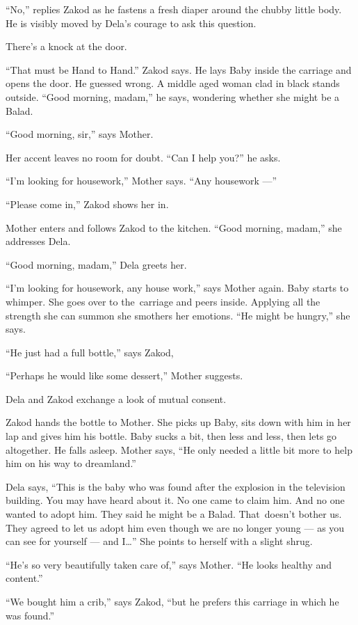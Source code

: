 \documentclass[twoside,11pt]{book}
\begin{document}
``No,'' replies Zakod as he fastens a fresh diaper around the chubby little body. He is
visibly moved by Dela's courage to ask this question.

There's a knock at the door.

``That must be Hand to Hand.'' Zakod says. He lays Baby inside the carriage  and opens the door. He
guessed wrong. A middle aged woman clad in black stands outside.
``Good morning, madam,'' he says, wondering whether she might be a Balad.

``Good morning, sir,'' says Mother.

Her accent leaves no room for doubt. ``Can I help you?'' he asks.

``I'm looking for housework,'' Mother says. ``Any housework ---''

``Please come in,'' Zakod shows her in.

Mother enters and follows Zakod to the kitchen. ``Good morning, madam,'' she addresses Dela.

``Good morning,  madam,'' Dela greets her.

``I'm looking for housework, any house work,'' says Mother again.  Baby starts to whimper.
She goes over to the~carriage and peers inside. Applying all the strength she can summon she smothers her emotions.
``He might be hungry,'' she says.

``He just had a full bottle,'' says Zakod,

``Perhaps he would like some dessert,'' Mother suggests.

Dela and Zakod exchange a look of mutual consent.

Zakod hands the bottle to Mother. She picks up Baby, sits down with him in her lap and gives him his bottle. Baby sucks
a bit, then less and less, then lets go altogether. He falls asleep. Mother says, ``He only needed a
little bit more to help him on his way to dreamland.''

Dela says, ``This is the baby who was found after the explosion in the television building. You may have
heard about it. No one came to claim him. And no one wanted to adopt him. They said he might be a Balad. That~doesn't
bother us. They agreed to let us adopt him even though we are no longer young --- as you can see for yourself --- and I{\ldots}'' She points to herself with a slight shrug.

``He's so very beautifully taken care of,'' says Mother. ``He looks healthy and
content.''

``We bought him a crib,'' says Zakod, ``but he prefers this carriage in which he
was found.''
\end{document}
